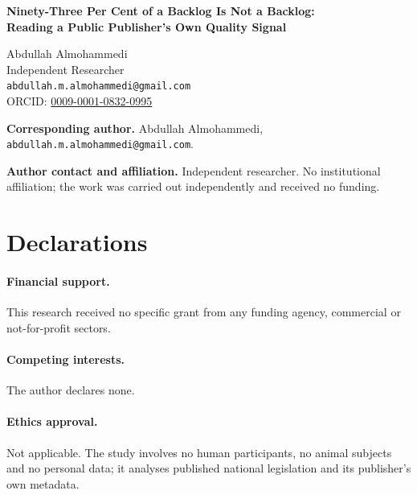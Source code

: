 \documentclass[11pt]{article}
\begin{document}
\begin{center}
{\Large\bfseries Ninety-Three Per Cent of a Backlog Is Not a Backlog:\\
Reading a Public Publisher's Own Quality Signal}

\vspace{2em}

Abdullah Almohammedi \\
    Independent Researcher \\
    \texttt{abdullah.m.almohammedi@gmail.com} \\
    ORCID: \href{https://orcid.org/0009-0001-0832-0995}{0009-0001-0832-0995}
\end{center}

\vspace{2em}

\noindent\textbf{Corresponding author.} Abdullah Almohammedi,
\texttt{abdullah.m.almohammedi@gmail.com}.

\vspace{1em}

\noindent\textbf{Author contact and affiliation.} Independent researcher.
No institutional affiliation; the work was carried out independently and
received no funding.

\vspace{1em}

\section*{Declarations}

\paragraph{Financial support.} This research received no specific grant from
any funding agency, commercial or not-for-profit sectors.

\paragraph{Competing interests.} The author declares none.

\paragraph{Ethics approval.} Not applicable. The study involves no human
participants, no animal subjects and no personal data; it analyses published
national legislation and its publisher's own metadata.
\end{document}
